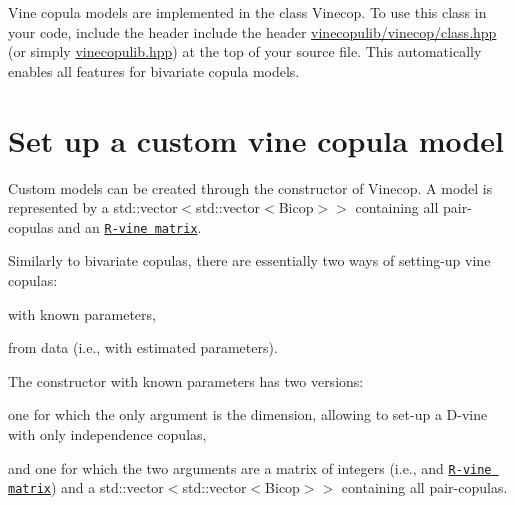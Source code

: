 Vine copula models are implemented in the class {\ttfamily Vinecop}. To use this class in your code, include the header include the header {\ttfamily \hyperlink{vinecop_2class_8hpp_source}{vinecopulib/vinecop/class.\+hpp}} (or simply {\ttfamily \hyperlink{vinecopulib_8hpp_source}{vinecopulib.\+hpp}}) at the top of your source file. This automatically enables all features for bivariate copula models.\hypertarget{overview-vinecop_vinecop-custom}{}\section{Set up a custom vine copula model}\label{overview-vinecop_vinecop-custom}
Custom models can be created through the constructor of {\ttfamily Vinecop}. A model is represented by a {\ttfamily std\+::vector$<$std\+::vector$<$Bicop$>$$>$} containing all pair-\/copulas and an \href{#how-to-read-an-r-vine-matrix}{\tt R-\/vine matrix}.

Similarly to bivariate copulas, there are essentially two ways of setting-\/up vine copulas\+:
\begin{DoxyItemize}
\item with known parameters,
\item from data (i.\+e., with estimated parameters).
\end{DoxyItemize}

The constructor with known parameters has two versions\+:
\begin{DoxyItemize}
\item one for which the only argument is the dimension, allowing to set-\/up a D-\/vine with only independence copulas,
\item and one for which the two arguments are a matrix of integers (i.\+e., and \href{#how-to-read-an-r-vine-matrix}{\tt R-\/vine matrix}) and a {\ttfamily std\+::vector$<$std\+::vector$<$Bicop$>$$>$} containing all pair-\/copulas.
\end{DoxyItemize}


